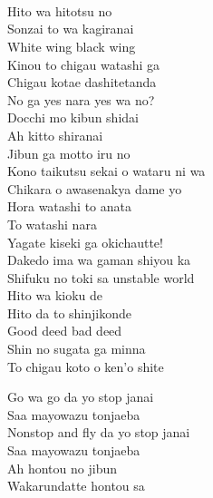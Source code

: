 \def\songtitle{in this unstable world}
\def\songcomment{}
\def\songlyrics{Aki Hata}
\def\songwriter{Rei Kamiya}
\def\songarrange{Rei Kamiya}
   
\ifdefined\COMPLETE
\else
	
	
\fi
\thispagestyle{song}

\begin{multicols}{2}
 \\
 \\
 \\


Hito wa hitotsu no\\
Sonzai to wa kagiranai\\
White wing black wing\\
Kinou to chigau watashi ga\\
Chigau kotae dashitetanda\\

No ga yes nara yes wa no?\\
Docchi mo kibun shidai\\
Ah kitto shiranai\\
Jibun ga motto iru no\\

Kono taikutsu sekai o wataru ni wa\\
Chikara o awasenakya dame yo\\
Hora watashi to anata\\
To watashi nara\\
Yagate kiseki ga okichautte!\\
Dakedo ima wa gaman shiyou ka\\
Shifuku no toki sa unstable world\\

Hito wa kioku de\\
Hito da to shinjikonde\\
Good deed bad deed\\
Shin no sugata ga minna\\
To chigau koto o ken'o shite\columnbreak

Go wa go da yo stop janai\\
Saa mayowazu tonjaeba\\
Nonstop and fly da yo stop janai\\
Saa mayowazu tonjaeba\\
Ah hontou no jibun\\
Wakarundatte hontou sa\\


\end{multicols}
